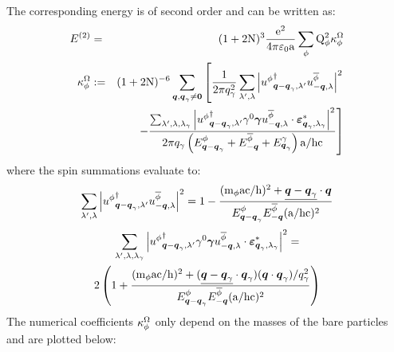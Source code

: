 \documentclass[10pt,a4paper,twoside,openany]{book}
\begin{document}
The corresponding energy is of second order and can be written as:
\begin{eqnarray*}
E^{(2)} & = & ( 1 + 2 \mathrm N )^3 \frac{\mathrm e^2}{4 \pi \mathrm \varepsilon_0 \mathrm a} \sum_{\phi} \mathrm Q_{\phi}^2 \kappa^\Omega_\phi \\
\kappa^\Omega_\phi & := & ( 1 + 2 \mathrm N )^{-6} \sum_{\boldsymbol{q},\boldsymbol{q}_\gamma \neq \boldsymbol{0}} \left[ \frac 1 {2 \pi q_\gamma^2} \sum_{\lambda',\lambda} \left| {u^{\phi}}^{\dagger}_{{\boldsymbol{q} - \boldsymbol{q}_\gamma}, {\lambda'}} u^{\overline{\phi}}_{{-\boldsymbol{q}}, {\lambda}} \right|^2 \right. \\
&& \left. - \frac {\sum_{\lambda',\lambda,\lambda_\gamma} \left| {u^{\phi}}^{\dagger}_{{\boldsymbol{q} - \boldsymbol{q}_\gamma}, {\lambda'}} \gamma^{0} \boldsymbol{\gamma} u^{\overline{\phi}}_{{-\boldsymbol{q}}, {\lambda}} \cdot \boldsymbol{\varepsilon}_{{\boldsymbol{q}_\gamma},{\lambda_\gamma}}^* \right|^2} {2 \pi q_\gamma \left( E^{\phi}_{\boldsymbol{q} - \boldsymbol{q}_\gamma} + E^{\overline{\phi}}_{-\boldsymbol{q}} + E^{\gamma}_{\boldsymbol{q}_\gamma} \right) \mathrm a / \mathrm h \mathrm c} \right]
\end{eqnarray*}
where the spin summations evaluate to:
\begin{equation*}
\sum_{\lambda',\lambda} \left| {u^{\phi}}^{\dagger}_{{\boldsymbol{q} - \boldsymbol{q}_\gamma}, {\lambda'}} u^{\overline{\phi}}_{{-\boldsymbol{q}}, {\lambda}} \right|^2 = 1 - \frac{( \mathrm m_{\phi} \mathrm a \mathrm c / \mathrm h )^2 + \underline{\boldsymbol{q} - \boldsymbol{q}_\gamma} \cdot \boldsymbol{q}}{E^{\phi}_{\boldsymbol{q} - \boldsymbol{q}_\gamma} E^{\overline{\phi}}_{-\boldsymbol{q}} ( \mathrm a / \mathrm h \mathrm c )^2} \\
\end{equation*}
\begin{multline*}
\sum_{\lambda',\lambda,\lambda_\gamma} \left| {u^{\phi}}^{\dagger}_{{\boldsymbol{q} - \boldsymbol{q}_\gamma}, {\lambda'}} \gamma^{0} \boldsymbol{\gamma} u^{\overline{\phi}}_{{-\boldsymbol{q}}, {\lambda}} \cdot \boldsymbol{\varepsilon}_{{\boldsymbol{q}_\gamma},{\lambda_\gamma}}^* \right|^2 = \\
2 \left( 1 + \frac{( \mathrm m_{\phi} \mathrm a \mathrm c / \mathrm h )^2 + ( \underline{\boldsymbol{q} - \boldsymbol{q}_\gamma} \cdot \boldsymbol{q}_\gamma ) ( \boldsymbol{q} \cdot \boldsymbol{q}_\gamma ) / q_\gamma^2}{E^{\phi}_{\boldsymbol{q} - \boldsymbol{q}_\gamma} E^{\overline{\phi}}_{-\boldsymbol{q}} ( \mathrm a / \mathrm h \mathrm c )^2} \right)
\end{multline*}
The numerical coefficients $\kappa^\Omega_\phi$ only depend on the masses of the bare particles and are plotted below:
\end{document}
